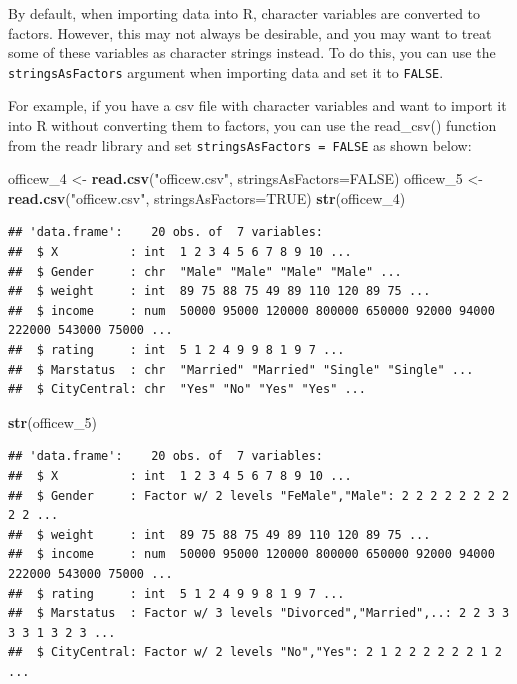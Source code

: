 \documentclass[
]{article}
\newenvironment{Shaded}{\begin{snugshade}}{\end{snugshade}}
\newcommand{\AttributeTok}[1]{\textcolor[rgb]{0.13,0.29,0.53}{#1}}
\newcommand{\ConstantTok}[1]{\textcolor[rgb]{0.56,0.35,0.01}{#1}}
\newcommand{\FunctionTok}[1]{\textcolor[rgb]{0.13,0.29,0.53}{\textbf{#1}}}
\newcommand{\NormalTok}[1]{#1}
\newcommand{\OtherTok}[1]{\textcolor[rgb]{0.56,0.35,0.01}{#1}}
\newcommand{\StringTok}[1]{\textcolor[rgb]{0.31,0.60,0.02}{#1}}
\begin{document}
By default, when importing data into R, character variables are
converted to factors. However, this may not always be desirable, and you
may want to treat some of these variables as character strings instead.
To do this, you can use the \texttt{stringsAsFactors} argument when
importing data and set it to \texttt{FALSE}.

For example, if you have a csv file with character variables and want to
import it into R without converting them to factors, you can use the
read\_csv() function from the readr library and set
\texttt{stringsAsFactors\ =\ FALSE} as shown below:

\begin{Shaded}
\begin{Highlighting}[]
\NormalTok{officew\_4 }\OtherTok{\textless{}{-}} \FunctionTok{read.csv}\NormalTok{(}\StringTok{"officew.csv"}\NormalTok{, }\AttributeTok{stringsAsFactors=}\ConstantTok{FALSE}\NormalTok{)}
\NormalTok{officew\_5 }\OtherTok{\textless{}{-}} \FunctionTok{read.csv}\NormalTok{(}\StringTok{"officew.csv"}\NormalTok{, }\AttributeTok{stringsAsFactors=}\ConstantTok{TRUE}\NormalTok{)}
\FunctionTok{str}\NormalTok{(officew\_4)}
\end{Highlighting}
\end{Shaded}

\begin{verbatim}
## 'data.frame':    20 obs. of  7 variables:
##  $ X          : int  1 2 3 4 5 6 7 8 9 10 ...
##  $ Gender     : chr  "Male" "Male" "Male" "Male" ...
##  $ weight     : int  89 75 88 75 49 89 110 120 89 75 ...
##  $ income     : num  50000 95000 120000 800000 650000 92000 94000 222000 543000 75000 ...
##  $ rating     : int  5 1 2 4 9 9 8 1 9 7 ...
##  $ Marstatus  : chr  "Married" "Married" "Single" "Single" ...
##  $ CityCentral: chr  "Yes" "No" "Yes" "Yes" ...
\end{verbatim}

\begin{Shaded}
\begin{Highlighting}[]
\FunctionTok{str}\NormalTok{(officew\_5)}
\end{Highlighting}
\end{Shaded}

\begin{verbatim}
## 'data.frame':    20 obs. of  7 variables:
##  $ X          : int  1 2 3 4 5 6 7 8 9 10 ...
##  $ Gender     : Factor w/ 2 levels "FeMale","Male": 2 2 2 2 2 2 2 2 2 2 ...
##  $ weight     : int  89 75 88 75 49 89 110 120 89 75 ...
##  $ income     : num  50000 95000 120000 800000 650000 92000 94000 222000 543000 75000 ...
##  $ rating     : int  5 1 2 4 9 9 8 1 9 7 ...
##  $ Marstatus  : Factor w/ 3 levels "Divorced","Married",..: 2 2 3 3 3 3 1 3 2 3 ...
##  $ CityCentral: Factor w/ 2 levels "No","Yes": 2 1 2 2 2 2 2 2 1 2 ...
\end{verbatim}
\end{document}
